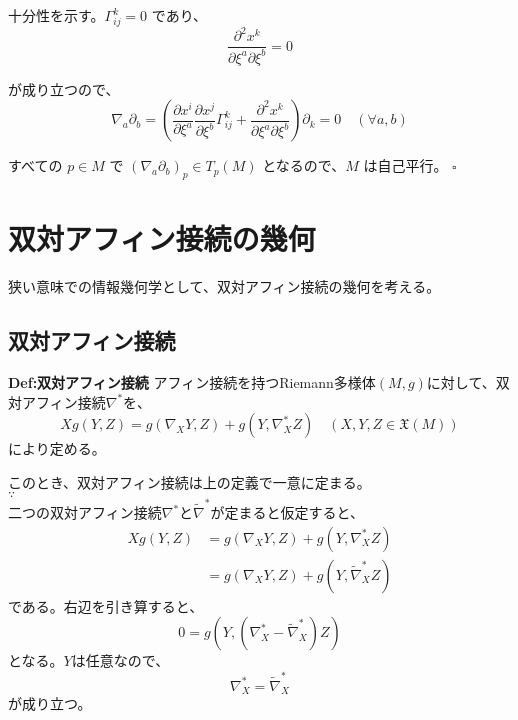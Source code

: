\documentclass[a4paper,11pt]{jsarticle}
\numberwithin{equation}{section}
\begin{document}
十分性を示す。\(\Gamma_{ij}^k = 0\) であり、
\begin{equation}
\frac{\partial^2 x^k}{\partial \xi^a \partial \xi^b} = 0 
\end{equation}

が成り立つので、
\begin{equation}
\nabla_a \partial_b = \left( \frac{\partial x^i}{\partial \xi^a} \frac{\partial x^j}{\partial \xi^b} \Gamma_{ij}^k + \frac{\partial^2 x^k}{\partial \xi^a \partial \xi^b} \right) \partial_k = 0 \quad (\forall a, b) 
\end{equation}

すべての \(p \in M\) で \((\nabla_a \partial_b)_p \in T_p(M)\) となるので、\(M\) は自己平行。 \(\square\)

\newpage

\section{双対アフィン接続の幾何}
狭い意味での情報幾何学として、双対アフィン接続の幾何を考える。\\
\subsection{双対アフィン接続}
\begin{itembox}[l]{\textbf{Def:双対アフィン接続}}
    アフィン接続を持つRiemann多様体$(M,g)$に対して、双対アフィン接続$\nabla ^*$を、
    \begin{equation}
        Xg(Y,Z) = g(\nabla_X Y,Z) + g(Y,\nabla^*_X Z) \quad (X,Y,Z \in \mathfrak{X}(M))
    \end{equation}
    により定める。
\end{itembox}
このとき、双対アフィン接続は上の定義で一意に定まる。\\
$\because$\\
二つの双対アフィン接続$\nabla^*$と$\tilde{\nabla}^*$が定まると仮定すると、
\begin{align}
    Xg(Y,Z) &= g(\nabla_X Y,Z) + g(Y,\nabla^*_X Z) \\
    &= g(\nabla_X Y,Z) + g(Y,\tilde{\nabla}^*_X Z)
\end{align}
である。右辺を引き算すると、
\begin{equation}
    0 = g(Y,(\nabla^*_X - \tilde{\nabla}^*_X)Z)
\end{equation}
となる。$Y$は任意なので、
\begin{equation}
    \nabla^*_X = \tilde{\nabla}^*_X
\end{equation}
が成り立つ。\hfill\qedsymbol
\end{document}
